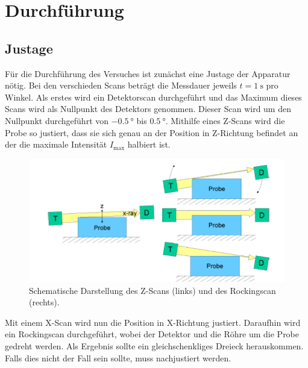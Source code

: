 \section{Durchführung}
\label{sec:Durchführung}
\subsection{Justage}
Für die Durchführung des Versuches ist zunächst eine Justage der Apparatur nötig. Bei den verschieden Scans beträgt die Messdauer jeweils $t=\SI{1}{\second}$ pro Winkel. Als erstes wird ein Detektorscan durchgeführt und das Maximum dieses Scans wird als Nullpunkt des Detektors genommen. Dieser Scan wird um den Nullpunkt durchgeführt von $\SI{-0.5}{\degree}$ bis $\SI{0.5}{\degree}$. Mithilfe eines Z-Scans wird die Probe so justiert, dass sie sich genau an der Position in Z-Richtung befindet an der die maximale Intensität $I_\mathrm{max}$ halbiert ist.
\begin{figure}[h!]
  \centering
  \includegraphics[scale=0.6]{fig/zscan.png}
  \caption{Schematische Darstellung des Z-Scans (links) und des Rockingscan (rechts). \cite[5]{Anleitung4}}
  \label{fig:zscanbei}
\end{figure}
\FloatBarrier
\noindent Mit einem X-Scan wird nun die Position in X-Richtung justiert.
Daraufhin wird ein Rockingscan durchgeführt, wobei der Detektor und die Röhre um die Probe gedreht werden. Als Ergebnis sollte ein gleichschenkliges Dreieck herauskommen. Falls dies nicht der Fall sein sollte, muss nachjustiert werden.

